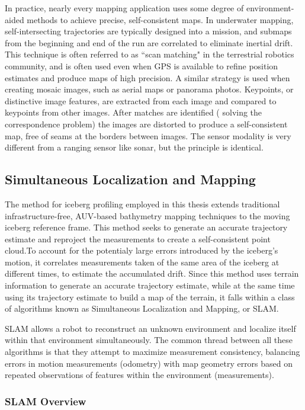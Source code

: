 In practice, nearly every mapping application uses some degree of environment-aided methods to achieve precise, self-consistent maps. In underwater mapping, self-intersecting trajectories are typically designed into a mission, and submaps from the beginning and end of the run are correlated to eliminate inertial drift. This technique is often referred to as ``scan matching" in the terrestrial robotics community, and is often used even when GPS is available to refine position estimates and produce maps of high precision. A similar strategy is used when creating mosaic images, such as aerial maps or panorama photos.  Keypoints, or distinctive image features, are extracted from each image and compared to keypoints from other images. After matches are identified ( solving the correspondence problem) the images are distorted to produce a self-consistent map, free of seams at the borders between images. The sensor modality is very different from a ranging sensor like sonar, but the principle is identical. 

\subsection{Simultaneous Localization and Mapping}
\label{sec.SLAM}
The method for iceberg profiling employed in this thesis extends traditional infrastructure-free, AUV-based bathymetry mapping techniques to the moving iceberg reference frame. This method seeks to generate an accurate trajectory estimate and reproject the measurements to create a self-consistent point cloud.To account for the potentialy large errors introduced by the iceberg's motion, it correlates measurements taken of the same area of the iceberg at different times, to estimate the accumulated drift. Since this method uses terrain information to generate an accurate trajectory estimate, while at the same time using its trajectory estimate to build a map of the terrain, it falls within a class of algorithms known as Simultaneous Localization and Mapping, or SLAM.

SLAM allows a robot to reconstruct an unknown environment and localize itself within that environment simultaneously.  The common thread between all these algorithms is that they attempt to maximize measurement consistency, balancing errors in motion measurements (odometry) with map geometry errors based on repeated observations of features within the environment (measurements).

\subsubsection{SLAM Overview}

